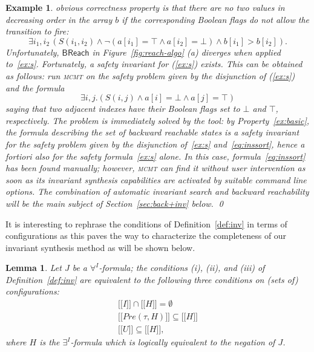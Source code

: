 \documentclass{LMCS}
\newcommand{\mywidehat}[1]{\ensuremath{\lbrack\!\lbrack #1 \rbrack\!\rbrack}}
\theoremstyle{plain}\newtheorem{assumption}[thm]{Assumption}
\theoremstyle{plain}\newtheorem{proposition}[thm]{Proposition}
\theoremstyle{plain}\newtheorem{property}[thm]{Property}
\theoremstyle{plain}\newtheorem{example}[thm]{Example}
\theoremstyle{plain}\newtheorem{claim}[thm]{Claim}
\theoremstyle{plain}\newtheorem{lemma}[thm]{Lemma}
\begin{document}
\begin{example}
  obvious correctness property is that there are no two values in
  decreasing order in the array $b$ if the corresponding Boolean flags
  do not allow the transition to fire:
  \begin{equation}
    \label{ex:s}
    \exists i_1,i_2\,
    (S(i_1, i_2) \wedge
    \neg (a[i_1]= \top \wedge a[i_2]= \bot) \wedge
    b[i_1]>b[i_2]) .
  \end{equation}
  Unfortunately, $\mathsf{BReach}$ in Figure~\ref{fig:reach-algo} (a)
  diverges when applied to~\eqref{ex:s}.  Fortunately, a safety
  invariant for (\ref{ex:s}) exists.  This can be obtained as follows:
  run \textsc{mcmt} on the safety problem given by the disjunction of
  (\ref{ex:s}) and the formula
  \begin{equation}
    \label{eq:inssort}
    \exists i, j.(S(i,j) \wedge a[i]= \bot \wedge a[j]= \top)
  \end{equation}
  saying that two adjacent indexes have their Boolean flags set to
  $\bot$ and $\top$, respectively. The problem is immediately solved
  by the tool: by Property~\ref{ex:basic}, the formula describing the
  set of backward reachable states is a safety invariant for the safety
  problem given by the disjunction of~\eqref{ex:s}
  and~\eqref{eq:inssort}, hence \emph{a fortiori} also for the safety
  formula~\eqref{ex:s} alone.  In this case,
  formula~\eqref{eq:inssort} has been found manually; however,
  \textsc{mcmt} \emph{can find it without user intervention} as soon
  as its invariant synthesis capabilities are activated by suitable
  command line options.  The combination of automatic invariant search
  and backward reachability will be the main subject of
  Section~\ref{sec:back+inv} below. \qed
\end{example}
It is interesting to rephrase the conditions of
Definition~\ref{def:inv} in terms of configurations as this paves the
way to characterize the completeness of our invariant synthesis method
as will be shown below.
\begin{lemma}
  \label{lem:inv}
  Let $J$ be a $\forall^I$-formula; the conditions (i), (ii), and
  (iii) of Definition~\ref{def:inv} are equivalent to the following
  three conditions on (sets of) configurations:
  \begin{eqnarray}
    \label{eq:si1}
    \mywidehat{I} \cap \mywidehat{H} =\emptyset\\
    \label{eq:si2}
    \mywidehat{Pre(\tau, H)}\subseteq \mywidehat{H}\\
    \label{eq:si3}
    \mywidehat{U}\subseteq \mywidehat{H} ,
  \end{eqnarray}
  where $H$ is the $\exists^I$-formula which is logically equivalent
  to the negation of $J$.
\end{lemma}
\end{document}
